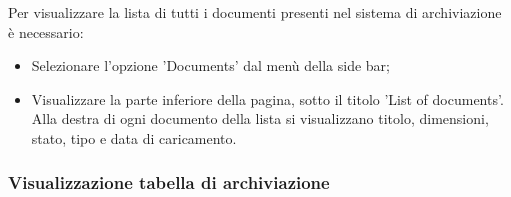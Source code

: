 \documentclass[10pt, a4paper]{article}
\begin{document}
    Per visualizzare la lista di tutti i documenti presenti nel sistema di archiviazione è necessario:
    \begin{itemize}
        \item Selezionare l'opzione 'Documents' dal menù della side bar;
        \item Visualizzare la parte inferiore della pagina, sotto il titolo 'List of documents'. Alla destra di ogni documento della lista si visualizzano titolo, dimensioni, stato, tipo e data di caricamento.
    \end{itemize}

\subsubsection{Visualizzazione tabella di archiviazione}
\end{document}
